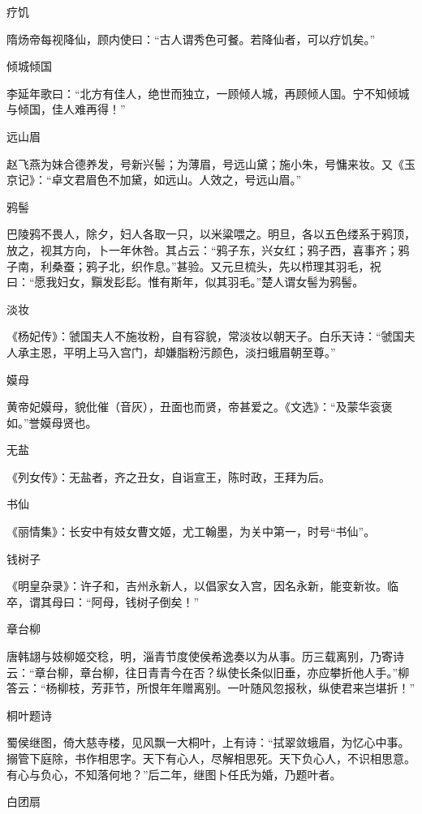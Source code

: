 \documentclass[a4paper,12pt,UTF8,twoside]{ctexbook}
\begin{document}
    疗饥
    
    隋炀帝每视降仙，顾内使曰：“古人谓秀色可餐。若降仙者，可以疗饥矣。”
    
    倾城倾国
    
    李延年歌曰：“北方有佳人，绝世而独立，一顾倾人城，再顾倾人国。宁不知倾城与倾国，佳人难再得！”
    
    远山眉
    
    赵飞燕为妹合德养发，号新兴髻；为薄眉，号远山黛；施小朱，号慵来妆。又《玉京记》：“卓文君眉色不加黛，如远山。人效之，号远山眉。”
    
    鸦髻
    
    巴陵鸦不畏人，除夕，妇人各取一只，以米粱喂之。明旦，各以五色缕系于鸦顶，放之，视其方向，卜一年休咎。其占云：“鸦子东，兴女红；鸦子西，喜事齐；鸦子南，利桑蚕；鸦子北，织作息。”甚验。又元旦梳头，先以栉理其羽毛，祝曰：“愿我妇女，黰发髟髟。惟有斯年，似其羽毛。”楚人谓女髻为鸦髻。
    
    淡妆
    
    《杨妃传》：虢国夫人不施妆粉，自有容貌，常淡妆以朝天子。白乐天诗：“虢国夫人承主恩，平明上马入宫门，却嫌脂粉污颜色，淡扫蛾眉朝至尊。”
    
    嫫母
    
    黄帝妃嫫母，貌仳催（音灰），丑面也而贤，帝甚爱之。《文选》：“及蒙华衮褒如。”誉嫫母贤也。
    
    无盐
    
    《列女传》：无盐者，齐之丑女，自诣宣王，陈时政，王拜为后。
    
    书仙
    
    《丽情集》：长安中有妓女曹文姬，尤工翰墨，为关中第一，时号“书仙”。
    
    钱树子
    
    《明皇杂录》：许子和，吉州永新人，以倡家女入宫，因名永新，能变新妆。临卒，谓其母曰：“阿母，钱树子倒矣！”
    
    章台柳
    
    唐韩翃与妓柳姬交稔，明，淄青节度使侯希逸奏以为从事。历三载离别，乃寄诗云：“章台柳，章台柳，往日青青今在否？纵使长条似旧垂，亦应攀折他人手。”柳答云：“杨柳枝，芳菲节，所恨年年赠离别。一叶随风忽报秋，纵使君来岂堪折！”
    
    桐叶题诗
    
    蜀侯继图，倚大慈寺楼，见风飘一大桐叶，上有诗：“拭翠敛蛾眉，为忆心中事。搦管下庭除，书作相思字。天下有心人，尽解相思死。天下负心人，不识相思意。有心与负心，不知落何地？”后二年，继图卜任氏为婚，乃题叶者。
    
    白团扇
    
\end{document}
